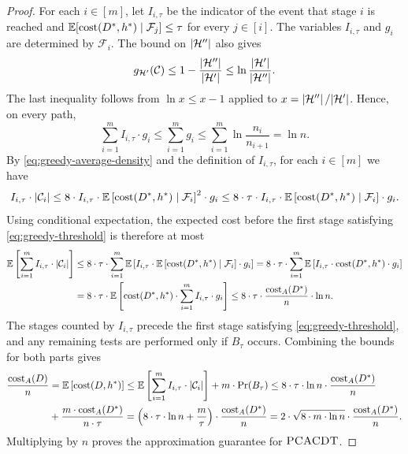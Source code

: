 \begin{proof}
For each $i\in[m]$, let $I_{i,\tau}$ be the indicator of the event that stage $i$ is reached and $\mathbb{E}[\operatorname{cost}\mathopen{}\left( D^*,h^* \right)\mid\mathcal{F}_j]\leq\tau$ for every $j\in[i]$. The variables $I_{i,\tau}$ and $g_i$ are determined by $\mathcal{F}_i$. The bound on $\mathopen{}\left| \mathcal{H}'' \right|$ also gives
\begin{equation}\label{eq:greedy-potential}
    g_{\mathcal{H}'}(\mathcal{C})
    \leq 1-\frac{\mathopen{}\left| \mathcal{H}'' \right|}{\mathopen{}\left| \mathcal{H}' \right|}
    \leq \ln\frac{\mathopen{}\left| \mathcal{H}' \right|}{\mathopen{}\left| \mathcal{H}'' \right|}.
\end{equation}
The last inequality follows from $\ln x\leq x-1$ applied to $x=\mathopen{}\left| \mathcal{H}'' \right|/\mathopen{}\left| \mathcal{H}' \right|$. Hence, on every path,
\[
    \sum_{i=1}^{m}I_{i,\tau}\cdot g_i
    \leq\sum_{i=1}^{m}g_i
    \leq\sum_{i=1}^{m}\ln\frac{n_i}{n_{i+1}}
    =\ln n.
\]
By \eqref{eq:greedy-average-density} and the definition of $I_{i,\tau}$, for each $i\in[m]$ we have
\[
    I_{i,\tau}\cdot\mathopen{}\left| \mathcal{C}_i \right|
    \leq 8\cdot I_{i,\tau}\cdot\mathbb{E}\left[\operatorname{cost}\mathopen{}\left( D^*,h^* \right)\mid\mathcal{F}_i\right]^2\cdot g_i
    \leq 8\cdot\tau\cdot I_{i,\tau}\cdot\mathbb{E}\left[\operatorname{cost}\mathopen{}\left( D^*,h^* \right)\mid\mathcal{F}_i\right]\cdot g_i.
\]
Using conditional expectation, the expected cost before the first stage satisfying \eqref{eq:greedy-threshold} is therefore at most
\begin{align*}
    \mathbb{E}\left[\sum_{i=1}^{m}I_{i,\tau}\cdot\mathopen{}\left| \mathcal{C}_i \right|\right]
    &\leq 8\cdot\tau\cdot\sum_{i=1}^{m}\mathbb{E}\left[I_{i,\tau}\cdot\mathbb{E}\left[\operatorname{cost}\mathopen{}\left( D^*,h^* \right)\mid\mathcal{F}_i\right]\cdot g_i\right]
    =8\cdot\tau\cdot\sum_{i=1}^{m}\mathbb{E}\left[I_{i,\tau}\cdot\operatorname{cost}\mathopen{}\left( D^*,h^* \right)\cdot g_i\right]\\
    &=8\cdot\tau\cdot\mathbb{E}\left[\operatorname{cost}\mathopen{}\left( D^*,h^* \right)\cdot\sum_{i=1}^{m}I_{i,\tau}\cdot g_i\right]
    \leq 8\cdot\tau\cdot\frac{\operatorname{cost}_A\mathopen{}\left( D^* \right)}{n}\cdot\ln n.
\end{align*}
The stages counted by $I_{i,\tau}$ precede the first stage satisfying \eqref{eq:greedy-threshold}, and any remaining tests are performed only if $B_{\tau}$ occurs. Combining the bounds for both parts gives
\begin{align*}
    \frac{\operatorname{cost}_A\mathopen{}\left( D \right)}{n}
    &=\mathbb{E}\left[\operatorname{cost}\mathopen{}\left( D,h^* \right)\right]
    \leq\mathbb{E}\left[\sum_{i=1}^{m}I_{i,\tau}\cdot\mathopen{}\left| \mathcal{C}_i \right|\right]
    +m\cdot\Pr\mathopen{}\left( B_{\tau} \right)
    \leq 8\cdot\tau\cdot\ln n\cdot\frac{\operatorname{cost}_A\mathopen{}\left( D^* \right)}{n}
    \\&+\frac{m\cdot\operatorname{cost}_A\mathopen{}\left( D^* \right)}{n\cdot\tau}
    =\mathopen{}\left( 8\cdot\tau\cdot\ln n+\frac{m}{\tau} \right)\cdot\frac{\operatorname{cost}_A\mathopen{}\left( D^* \right)}{n}
    =2\cdot\sqrt{8\cdot m\cdot\ln n}\cdot\frac{\operatorname{cost}_A\mathopen{}\left( D^* \right)}{n}.
\end{align*}
Multiplying by $n$ proves the approximation guarantee for $\textup{\textsc{PCACDT}}$.
\end{proof}
